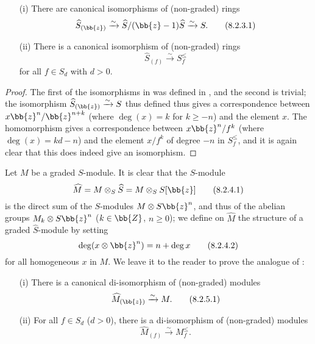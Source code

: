 \begin{lemma}[8.2.3]
\label{II.8.2.3}
\begin{enumerate}
  \item[\rm{(i)}] There are canonical isomorphisms of (non-graded) rings
    \[
    \label{II.8.2.3.1}
      \widehat{S}_{(\bb{z})}
      \xrightarrow{\sim}
      \widehat{S}/(\bb{z}-1)\widehat{S}
      \xrightarrow{\sim}
      S.
    \tag{8.2.3.1}
    \]
  \item[\rm{(ii)}] There is a canonical isomorphism of (non-graded) rings
    \[
    \label{II.8.2.3.2}
      \widehat{S}_{(f)} \xrightarrow{\sim} S_f^\leq
    \tag{8.2.3.2}
    \]
    for all $f\in S_d$ with $d>0$.
\end{enumerate}
\end{lemma}

\begin{proof}
The first of the isomorphisms in  was defined in , and the second is trivial;
the isomorphism $\widehat{S}_{(\bb{z})} \xrightarrow{\sim} S$ thus defined thus gives a correspondence between $x\bb{z}^n/\bb{z}^{n+k}$ (where $\deg(x) = k$ for $k\geq -n$) and the element $x$.
The homomorphism  gives a correspondence between $x\bb{z}^n/f^k$ (where $\deg(x) = kd-n$) and the element $x/f^k$ of degree $-n$ in $S_f^\leq$, and it is again clear that this does indeed give an isomorphism.
\end{proof}

\begin{env}[8.2.4]
\label{II.8.2.4}
Let $M$ be a graded $S$-module.
It is clear that the $S$-module
\[
\label{II.8.2.4.1}
  \widehat{M} = M \otimes_S \widehat{S} = M \otimes_S S[\bb{z}]
\tag{8.2.4.1}
\]
is the direct sum of the $S$-modules $M\otimes S\bb{z}^n$, and thus of the abelian groups $M_k\otimes S\bb{z}^n$ ($k\in\bb{Z}$, $n\geq0$);
we define on $\widehat{M}$ the structure of a graded $\widehat{S}$-module by setting
\[
\label{II.8.2.4.2}
  \deg(x\otimes\bb{z}^n) = n+\deg x
\tag{8.2.4.2}
\]
for all homogeneous $x$ in $M$.
We leave it to the reader to prove the analogue of :
\end{env}

\begin{lemma}[8.2.5]
\label{II.8.2.5}
\begin{enumerate}
  \item[\rm{(i)}] There is a canonical di-isomorphism of (non-graded) modules
    \[
    \label{II.8.2.5.1}
      \widehat{M}_{(\bb{z})} \xrightarrow{\sim} M.
    \tag{8.2.5.1}
    \]
  \item[\rm{(ii)}] For all $f\in S_d$ ($d>0$), there is a di-isomorphism of (non-graded) modules
    \[
    \label{II.8.2.5.2}
      \widehat{M}_{(f)} \xrightarrow{\sim} M_f^\leq.
    \tag{8.2.5.2}
    \]
\end{enumerate}
\end{lemma}

